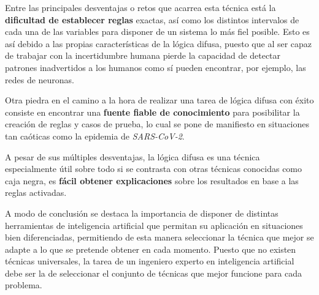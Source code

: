 \documentclass[12pt,a4paper, xcolor=table]{article}
\begin{document}
  \vspace{2mm}

  Entre las principales desventajas o retos que acarrea esta técnica está la \textbf{dificultad de establecer reglas} exactas, así como los distintos intervalos de cada una de las variables para disponer de un sistema lo más fiel posible. Esto es así debido a las propias características de la lógica difusa, puesto que al ser capaz de trabajar con la incertidumbre humana pierde la capacidad de detectar patrones inadvertidos a los humanos como sí pueden encontrar, por ejemplo, las redes de neuronas.

  \vspace{2mm}


  Otra piedra en el camino a la hora de realizar una tarea de lógica difusa con éxito consiste en encontrar una \textbf{fuente fiable de conocimiento} para posibilitar la creación de reglas y casos de prueba, lo cual se pone de manifiesto en situaciones tan caóticas como la epidemia de \textit{SARS-CoV-2}.

  \vspace{2mm}

  A pesar de sus múltiples desventajas, la lógica difusa es una técnica especialmente útil sobre todo si se contrasta con otras técnicas conocidas como caja negra, es \textbf{fácil obtener explicaciones} sobre los resultados en base a las reglas activadas.

  \vspace{3mm}

  A modo de conclusión se destaca la importancia de disponer de distintas herramientas de inteligencia artificial que permitan su aplicación en situaciones bien diferenciadas, permitiendo de esta manera seleccionar la técnica que mejor se adapte a lo que se pretende obtener en cada momento. Puesto que no existen técnicas universales, la tarea de un ingeniero experto en inteligencia artificial debe ser la de seleccionar el conjunto de técnicas que mejor funcione para cada problema.

\clearpage



\end{document}
